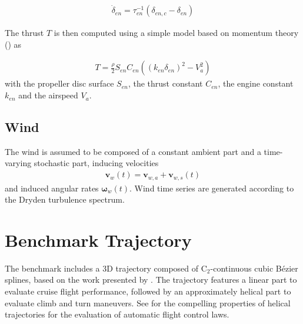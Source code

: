 \documentclass{ifacconf}
\begin{document}
\begin{align}
\dot{\delta}_{en}
=
\tau_{en}^{-1}
(
\delta_{en, c}
- \delta_{en}
)
\end{align}

The thrust $T$ is then computed using a simple model based on momentum theory (\cite{Beard2012}) as

\begin{align}
T = \frac{\rho}{2}
S_{en}
C_{en} 
(
(k_{en}\delta_{en})^2
-V_a^2
)
\end{align}
with the propeller disc surface $S_{en}$, the thrust constant $C_{en}$, the engine constant $k_{en}$ and the airspeed $V_a$.


\subsection{Wind}
The wind is assumed to be composed of a constant ambient part and a time-varying stochastic part, inducing velocities
\begin{align}
\mathbf{v}_w(t) = \mathbf{v}_{w,a} + \mathbf{v}_{w,s}(t)
\end{align}
and induced angular rates
$\mathbf{\omega}_w(t)$. 
Wind time series are generated according to the Dryden turbulence spectrum. 

\section{Benchmark Trajectory}
\label{sec:trajectory}
The benchmark includes a 3D trajectory composed of $\mathrm{C}_2$-continuous cubic Bézier splines, based on the work presented by \cite{Yang2008}. The trajectory features a linear part to evaluate cruise flight performance, followed by an approximately helical part to evaluate climb and turn maneuvers. See \cite{looye2011helical} for the compelling properties of helical trajectories for the evaluation of automatic flight control laws.
\end{document}
